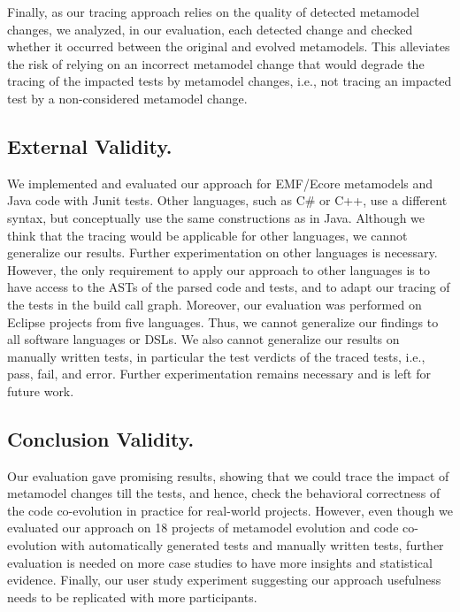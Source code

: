 Finally, as our tracing approach relies on the quality of detected metamodel changes, we analyzed, in our evaluation, each detected change and checked whether it occurred between the original and evolved metamodels. This alleviates the risk of relying on an incorrect metamodel change that would degrade the tracing of the impacted tests by metamodel changes, i.e., not tracing an impacted test by a non-considered metamodel change. 

\subsection{External Validity.} 
We implemented and evaluated our approach for EMF/Ecore metamodels and Java code with Junit tests. Other languages, such as C\# or C++, use a different syntax, but conceptually use the same constructions as in Java.
Although we think that the tracing would be applicable for other languages, we cannot generalize our results. Further experimentation on other languages is necessary. However, the only requirement to apply our approach to other languages is to have access to the ASTs of the parsed code and tests, and to adapt our tracing of the tests in the build call graph. 
%
Moreover, our evaluation was performed on Eclipse projects from five languages. Thus, we cannot generalize our findings to all software languages or DSLs. We also cannot generalize our results on manually written tests, in particular the test verdicts of the traced tests, i.e., pass, fail, and error. Further experimentation remains necessary and is left for future work. 

\subsection{Conclusion Validity.}
Our evaluation gave promising results, showing that we could trace the impact of metamodel changes till the tests, and hence, check the behavioral correctness of the code co-evolution in practice for real-world projects. 
However, even though we evaluated our approach on 18 projects of metamodel evolution and code co-evolution with automatically generated tests and manually written tests, further evaluation is needed on more case studies to have more insights and statistical evidence. Finally, our user study experiment suggesting our approach usefulness needs to be replicated with more participants.

